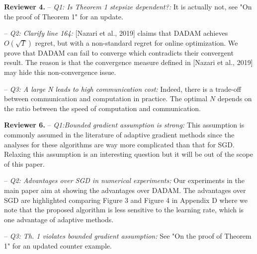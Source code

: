 \documentclass{article}
\begin{document}
\textbf{Reviewer 4.} 
-- \textit{Q1: Is Theorem 1 stepsize dependent?:} It is actually not, see "On the proof of Theorem 1" for an update.\vspace{-5pt}

-- \textit{Q2:  Clarify line 164:}
 [Nazari et al., 2019] claims that DADAM achieves $O(\sqrt{T})$ regret, but with a non-standard regret for online optimization. 
 We prove that DADAM can fail to converge which contradicts their convergent result. 
 The reason is that the convergence measure defined in [Nazari et al., 2019] may hide this non-convergence issue.\vspace{-5pt}

-- \textit{Q3: A large N leads to high communication cost:}
Indeed, there is a trade-off between communication and computation in practice.
The optimal $N$ depends on the ratio between the speed of computation and communication.  

\vspace{-2pt}

\textbf{Reviewer 6.} 
-- \textit{Q1:Bounded gradient assumption is strong:}
This assumption is commonly assumed in the literature of adaptive gradient methods since the analyses for these algorithms are way more complicated than that for SGD. 
Relaxing this assumption is an interesting question but it will be out of the scope of this paper.\vspace{-5pt}

-- \textit{Q2: Advantages over SGD in numerical experiments:}
Our experiments in the main paper aim at showing the advantages over DADAM. 
The advantages over SGD are highlighted comparing Figure 3 and Figure 4 in Appendix D where we note that the proposed algorithm is less sensitive to the learning rate, which is one advantage of adaptive methods.\vspace{-5pt}

-- \textit{Q3: Th. 1 violates bounded gradient assumption:} See "On the proof of Theorem 1" for an updated counter example.\vspace{-5pt}



\end{document}
